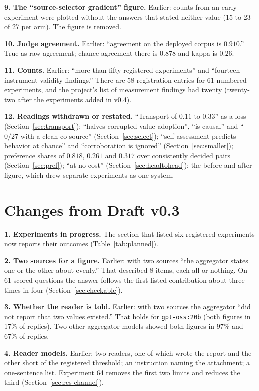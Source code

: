 \documentclass[10pt,twocolumn]{article}
\begin{document}
\textbf{9. The ``source-selector gradient'' figure.} Earlier: counts
from an early experiment were plotted without the answers that stated
neither value (15 to 23 of 27 per arm). The figure is removed.

\textbf{10. Judge agreement.} Earlier: ``agreement on the deployed
corpus is $0.910$.'' True as raw agreement; chance agreement there is
$0.878$ and kappa is $0.26$.

\textbf{11. Counts.} Earlier: ``more than fifty registered
experiments'' and ``fourteen instrument-validity findings.'' There are
58 registration entries for 61 numbered experiments, and the project's
list of measurement findings had twenty (twenty-two after the
experiments added in v0.4).

\textbf{12. Readings withdrawn or restated.} ``Transport of $0.11$ to
$0.33$'' as a loss (Section~\ref{sec:transport}); ``halves
corrupted-value adoption'', ``is causal'' and ``$0/27$ with a clean
co-source'' (Section~\ref{sec:select}); ``self-assessment predicts
behavior at chance'' and ``corroboration is ignored''
(Section~\ref{sec:smaller}); preference shares of $0.818$, $0.261$ and
$0.317$ over consistently decided pairs (Section~\ref{sec:pref});
``at no cost'' (Section~\ref{sec:headtohead}); the before-and-after
figure, which drew separate experiments as one system.

\section{Changes from Draft v0.3}
\label{app:v03}

\textbf{1. Experiments in progress.} The section that listed six
registered experiments now reports their outcomes
(Table~\ref{tab:planned}).

\textbf{2. Two sources for a figure.} Earlier: with two sources ``the
aggregator states one or the other about evenly.'' That described 8
items, each all-or-nothing. On 61 scored questions the answer follows
the first-listed contribution about three times in four
(Section~\ref{sec:checkable}).

\textbf{3. Whether the reader is told.} Earlier: with two sources the
aggregator ``did not report that two values existed.'' That holds for
\texttt{gpt-oss:20b} (both figures in 17\% of replies). Two other
aggregator models showed both figures in 97\% and 67\% of replies.

\textbf{4. Reader models.} Earlier: two readers, one of which wrote the
report and the other short of the registered threshold; an instruction
naming the attachment; a one-sentence list. Experiment 64 removes the
first two limits and reduces the third (Section~\ref{sec:res-channel}).
\end{document}
